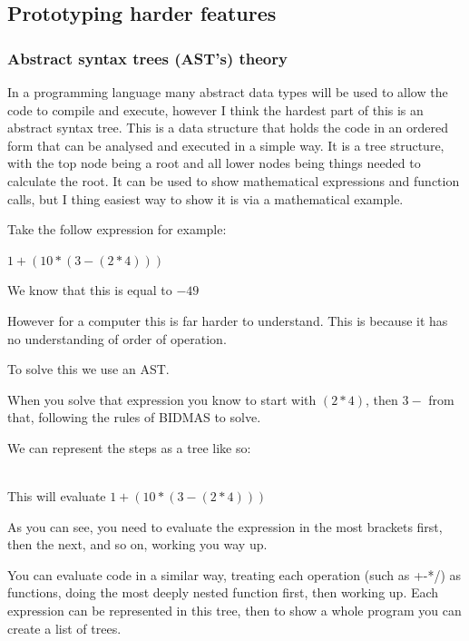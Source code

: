 \documentclass[a4paper,12pt]{article}
\begin{document}
{\subsection{Prototyping harder features}
\subsubsection{Abstract syntax trees (AST's) theory}
In a programming language many abstract data types will be used to allow the code 
to compile and execute, however I think the hardest part of this is an abstract 
syntax tree. This is a data structure that holds the code in an ordered form that 
can be analysed and  executed in a simple way. It is a tree structure, with the top 
node being a root and all lower nodes being things needed to calculate the root. It can 
be used to show mathematical expressions and function calls, but I thing easiest way to 
show it is via a mathematical example.

Take the follow expression for example:

{\Large{\(1 + (10 * (3 - (2 * 4)))\)}}

We know that this is equal to \(-49\)

However for a computer this is far harder to understand. This is because it has no 
understanding of order of operation.

To solve this we use an AST.

When you solve that expression you know to start with 
\((2 * 4)\), then \(3 -\) 
from that, following the rules of BIDMAS to solve.

We can represent the steps as a tree like so:

\\
This will evaluate \(1 + (10 * (3 - (2 * 4)))\)

As you can see, you need to evaluate the expression in the most brackets
first, then the next, and so on, working you way up.

You can evaluate code in a similar way, treating each operation (such as +-*/)
as functions, doing the most deeply nested function first, then working up. 
Each expression can be represented in this tree, then to show a whole program you 
can create a list of trees.

}
\end{document}
